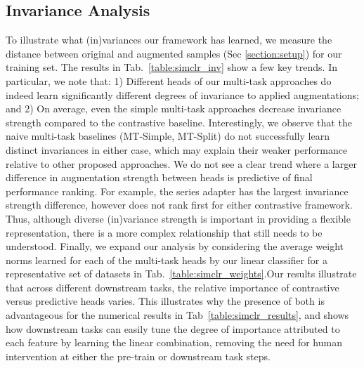 \documentclass{INTERSPEECH2023}
\begin{document}
\subsection{Invariance Analysis}
To illustrate what (in)variances our framework has learned, we measure the distance between  original and augmented samples (Sec \ref{section:setup}) for our training set. The results in Tab.~\ref{table:simclr_inv} show a few key trends. In particular, we note that: 1) Different heads of our multi-task approaches do indeed learn significantly different degrees of invariance to applied augmentations; and 2) On average, even the simple multi-task approaches decrease invariance strength compared to the contrastive baseline. Interestingly, we observe that the naive multi-task baselines (MT-Simple, MT-Split) do not successfully learn distinct invariances in either case, which may explain their weaker performance relative to other proposed approaches. We do not see a clear trend where a larger difference in augmentation strength between heads is predictive of final performance ranking. For example, the series adapter has the largest invariance strength difference, however does not rank first for either contrastive framework. Thus, although diverse (in)variance strength is important in providing a flexible representation, there is a more complex relationship that still needs to be understood.  Finally, we expand our analysis by considering the average weight norms learned for each of the multi-task heads by our linear classifier for a representative set of datasets in Tab.~\ref{table:simclr_weights}.Our results illustrate that across different downstream tasks, the relative importance of contrastive versus predictive heads varies. This illustrates why the presence of both is advantageous for the numerical results in Tab~\ref{table:simclr_results}, and shows how downstream tasks can easily tune the degree of importance attributed to each feature by learning the linear combination, removing the need for human intervention at either the pre-train or downstream task steps.
\end{document}
